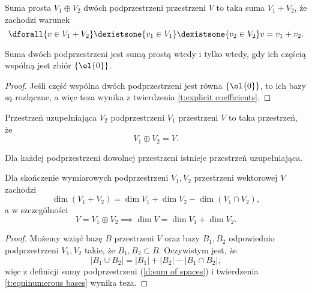 \begin{definition}
    Suma prosta $V_1 \oplus V_2$ dwóch podprzestrzeni przestrzeni $V$ to taka suma $V_1 + V_2$, że zachodzi warunek
    \[ \dforall{v \in V_1 + V_2} \dexistsone{v_1 \in V_1} \dexistsone{v_2 \in V_2} v = v_1 + v_2. \]
\end{definition}

\begin{theorem}
    Suma dwóch podprzestrzeni jest sumą prostą wtedy i tylko wtedy, gdy ich częścią wspólną jest zbiór $\{\ol{0}\}$.
\end{theorem}
\begin{proof}
    Jeśli część wspólna dwóch podprzestrzeni jest równa $\{\ol{0}\}$, to ich bazy są rozłączne, a więc teza wynika z twierdzenia \ref{t:explicit coefficients}.
\end{proof}

\begin{definition}
    Przestrzeń uzupełniająca $V_2$ podprzestrzeni $V_1$ przestrzeni $V$ to taka przestrzeń, że
    \[ V_1 \oplus V_2 = V. \]
\end{definition}

\begin{fact}
    Dla każdej podprzestrzeni dowolnej przestrzeni istnieje przestrzeń uzupełniająca.
\end{fact}

\begin{theorem}
    Dla skończenie wymiarowych podprzestrzeni $V_1, V_2$ przestrzeni wektorowej $V$ zachodzi
    \[ \dim(V_1 + V_2) = \dim V_1 + \dim V_2 - \dim(V_1 \cap V_2), \]
    a w szczególności
    \[ V = V_1 \oplus V_2 \implies \dim V = \dim V_1 + \dim V_2. \]
\end{theorem}
\begin{proof}
    Możemy wziąć bazę $B$ przestrzeni $V$ oraz bazy $B_1, B_2$ odpowiednio podprzestrzeni $V_1, V_2$ takie, że $B_1, B_2 \subset B$. Oczywistym jest, że
    \[ |B_1 \cup B_2| = |B_1| + |B_2| - |B_1 \cap B_2|, \]
    więc z definicji sumy podprzestrzeni (\ref{d:sum of spaces}) i twierdzenia \ref{t:equinumerous bases} wynika teza.
\end{proof}